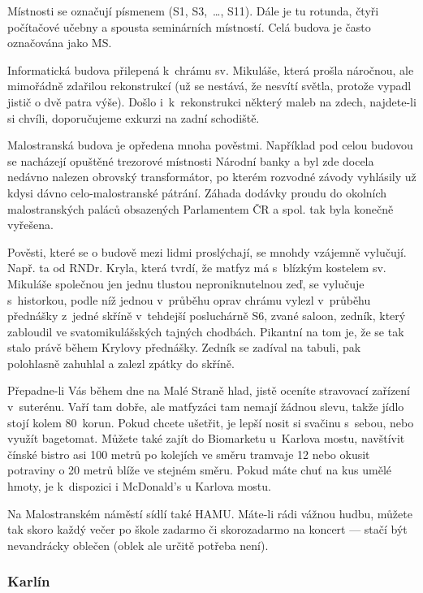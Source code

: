 Místnosti se označují písmenem
 (S1, S3,~\dots, S11). Dále je tu rotunda, čtyři počítačové učebny a spousta seminárních
místností. Celá budova je často označována jako MS.

Informatická budova přilepená k~chrámu sv. Mikuláše, která prošla
náročnou, ale mimořádně zdařilou rekonstrukcí (už se nestává, že
nesvítí světla, protože vypadl jistič o dvě patra výše). Došlo
i~k~rekonstrukci některý maleb na zdech, najdete-li si chvíli,
doporučujeme exkurzi na zadní schodiště.

Malostranská budova je opředena mnoha pověstmi. Například pod
celou budovou se nacházejí opuštěné trezorové místnosti Národní
banky a byl zde docela nedávno nalezen obrovský transformátor, po
kterém rozvodné závody vyhlásily už kdysi dávno celo-malostranské
pátrání. Záhada dodávky proudu do okolních malostranských paláců
obsazených Parlamentem ČR a spol. tak byla konečně vyřešena.

Pověsti, které se o budově mezi lidmi proslýchají, se mnohdy
vzájemně vylučují. Např. ta od RNDr. Kryla, která tvrdí, že matfyz
má s~blízkým kostelem sv. Mikuláše společnou jen jednu tlustou
neproniknutelnou zeď, se vylučuje s~historkou, podle níž jednou
v~průběhu oprav chrámu vylezl v~průběhu přednášky z~jedné skříně
v~tehdejší posluchárně S6, zvané saloon, zedník, který zabloudil
ve svatomikulášských tajných chodbách. Pikantní na tom je, že se
tak stalo právě během Krylovy přednášky. Zedník se zadíval na
tabuli, pak polohlasně zahuhlal  a zalezl zpátky do
skříně.

Přepadne-li Vás během dne na Malé Straně hlad, jistě oceníte
stravovací zařízení  v~suterénu. Vaří tam dobře,
ale matfyzáci tam nemají žádnou slevu, takže jídlo stojí kolem
80~korun. Pokud chcete ušetřit, je lepší nosit si svačinu
s~sebou, nebo využít bagetomat. Můžete také zajít do Biomarketu
u~Karlova mostu, navštívit čínské bistro asi 100 metrů po kolejích
ve směru tramvaje 12 nebo okusit potraviny o 20 metrů blíže ve
stejném směru. Pokud máte chuť na kus umělé hmoty, je k~dispozici i McDonald's u Karlova mostu.

Na Malostranském náměstí sídlí také HAMU. Máte-li rádi vážnou hudbu, můžete tak skoro každý večer po škole zadarmo či
skorozadarmo na koncert --- stačí být nevandrácky oblečen (oblek ale určitě potřeba není).


\subsubsection{Karlín}

